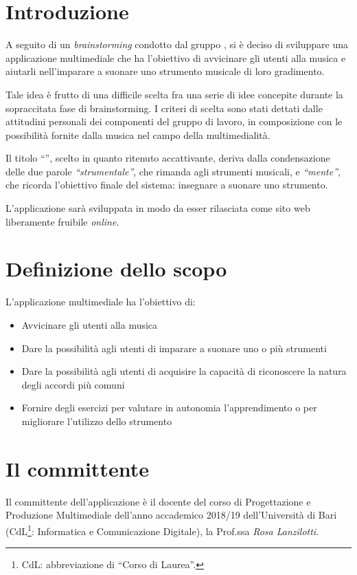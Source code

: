 \section{Introduzione}
A seguito di un \textit{brainstorming} condotto dal gruppo \theteam{}, si è deciso di sviluppare una applicazione multimediale che ha l'obiettivo di avvicinare gli utenti alla musica e aiutarli nell'imparare a suonare uno strumento musicale di loro gradimento.

Tale idea è frutto di una difficile scelta fra una serie di idee concepite durante la sopraccitata fase di brainstorming. I criteri di scelta sono stati dettati dalle attitudini personali dei componenti del gruppo di lavoro, in composizione con le possibilità fornite dalla musica nel campo della multimedialità.

Il titolo ``\ProjectTitle{}'', scelto in quanto ritenuto accattivante, deriva dalla condensazione delle due parole \emph{``strumentale''}, che rimanda agli strumenti musicali, e \emph{``mente''}, che ricorda l'obiettivo finale del sistema: insegnare a suonare uno strumento.

L'applicazione sarà sviluppata in modo da esser rilasciata come sito web liberamente fruibile \emph{online}.

\section{Definizione dello scopo}
L'applicazione multimediale \ProjectTitle{} ha l'obiettivo di:
\begin{itemize}
	\item Avvicinare gli utenti alla musica
	\item Dare la possibilità agli utenti di imparare a suonare uno o più strumenti
	\item Dare la possibilità agli utenti di acquisire la capacità di riconoscere la natura degli accordi più comuni
	\item Fornire degli esercizi per valutare in autonomia l'apprendimento o per migliorare l'utilizzo dello strumento
\end{itemize}

\section{Il committente}
Il committente dell'applicazione è il docente del corso di Progettazione e Produzione Multimediale dell'anno accademico 2018/19 dell'Università di Bari (CdL\footnote{CdL: abbreviazione di ``Corso di Laurea''.}: Informatica e Comunicazione Digitale), la Prof.ssa \emph{Rosa Lanzilotti}.

